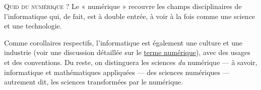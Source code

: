 
\lettrine{Q}{uid du numérique ?} Le « numérique » recouvre les champs disciplinaires de l'informatique qui, de fait, est à double entrée, à voir à la fois comme une science et une technologie. 

Comme corollaires respectifs, l'informatique est également une cul\-ture et une industrie (voir une discussion détaillée sur le \href{https://pixees.fr/sur-la-definition-du-mot-numerique/}{terme numérique}), avec des usages et des conventions. 
Du reste, on distinguera les sciences \emph{du} numérique --- à savoir, informatique et mathématiques appliquées --- des sciences numériques --- autrement dit, les sciences transformées par le numérique. 

